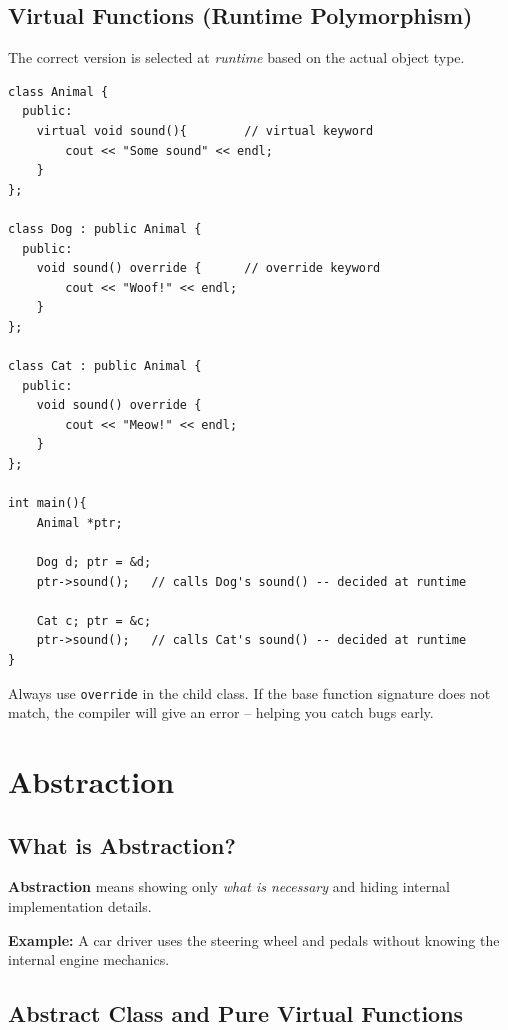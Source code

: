 \documentclass[12pt,a4paper]{report}
\begin{document}
\section{Virtual Functions (Runtime Polymorphism)}
The correct version is selected at \textit{runtime} based on the actual object type.

\begin{lstlisting}[caption={Virtual Functions and Runtime Polymorphism}]
class Animal {
  public:
    virtual void sound(){        // virtual keyword
        cout << "Some sound" << endl;
    }
};

class Dog : public Animal {
  public:
    void sound() override {      // override keyword
        cout << "Woof!" << endl;
    }
};

class Cat : public Animal {
  public:
    void sound() override {
        cout << "Meow!" << endl;
    }
};

int main(){
    Animal *ptr;

    Dog d; ptr = &d;
    ptr->sound();   // calls Dog's sound() -- decided at runtime

    Cat c; ptr = &c;
    ptr->sound();   // calls Cat's sound() -- decided at runtime
}
\end{lstlisting}

\begin{tipbox}
Always use \texttt{override} in the child class. If the base function signature does not match,
the compiler will give an error -- helping you catch bugs early.
\end{tipbox}

\chapter{Abstraction}

\section{What is Abstraction?}

\textbf{Abstraction} means showing only \textit{what is necessary} and hiding internal implementation details.

\textbf{Example:} A car driver uses the steering wheel and pedals without knowing the internal engine mechanics.

\section{Abstract Class and Pure Virtual Functions}
\end{document}
